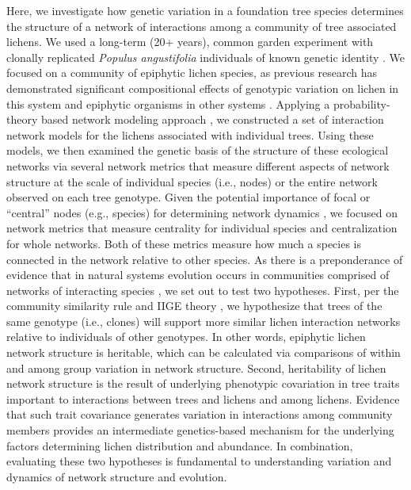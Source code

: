 \documentclass[fleqn,12pt]{olplainarticle}
\begin{document}
Here, we investigate how genetic variation in a foundation tree
species determines the structure of a network of interactions among a
community of tree associated lichens.  We used a long-term (20+
years), common garden experiment with clonally replicated
\textit{Populus angustifolia} individuals of known genetic identity
\citep{Martinsen2001HybridSpecies}. We focused on a community of
epiphytic lichen species, as previous research has demonstrated
significant compositional effects of genotypic variation on lichen in
this system \citep{Lamit2011, Lamit2015a, Lamit2015c} and epiphytic
organisms in other systems \citep{Winfree2011, Zytynska2011}. Applying
a probability-theory based network modeling approach
\citep{Araujo2011}, we constructed a set of interaction network models
for the lichens associated with individual trees. Using these models,
we then examined the genetic basis of the structure of these
ecological networks via several network metrics that measure different
aspects of network structure at the scale of individual species (i.e.,
nodes) or the entire network observed on each tree genotype. Given the
potential importance of focal or ``central'' nodes (e.g., species) for
determining network dynamics \citep{Lieberman2005EvolutionaryGraphs},
we focused on network metrics that measure centrality for individual
species and centralization for whole networks. Both of these metrics
measure how much a species is connected in the network relative to
other species. As there is a preponderance of evidence that in natural
systems evolution occurs in communities comprised of networks of
interacting species \citep{Lau2016afix, Keith2017, Thompson2013,
  Bascompte2006}, we set out to test two hypotheses. First, per the
community similarity rule \citep{Bangert2006} and IIGE theory
\citep{Whitham2020IntraspecificEvolution}, we hypothesize that trees
of the same genotype (i.e., clones) will support more similar lichen
interaction networks relative to individuals of other genotypes. In
other words, epiphytic lichen network structure is heritable, which
can be calculated via comparisons of within and among group variation
in network structure. Second, heritability of lichen network structure
is the result of underlying phenotypic covariation in tree traits
important to interactions between trees and lichens and among
lichens. Evidence that such trait covariance generates variation in
interactions among community members provides an intermediate
genetics-based mechanism for the underlying factors determining lichen
distribution and abundance. In combination, evaluating these two
hypotheses is fundamental to understanding variation and dynamics of
network structure and evolution.
\end{document}
